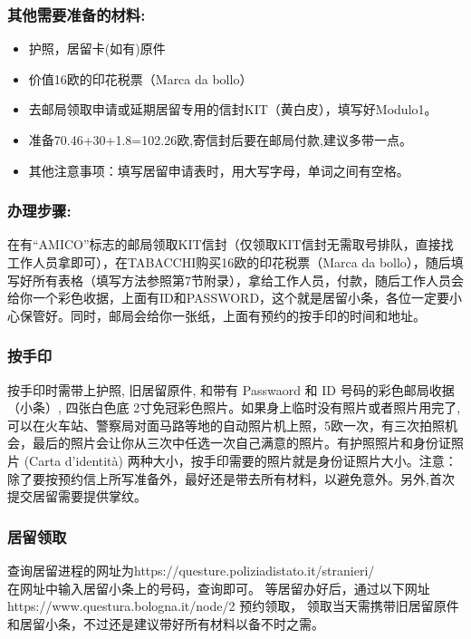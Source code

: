 \subsubsection{其他需要准备的材料:}
\begin{itemize} 
\item 护照，居留卡(如有)原件
\item 价值16欧的印花税票（Marca da bollo）
\item 去邮局领取申请或延期居留专用的信封KIT（黄白皮），填写好Modulo1。
\item 准备70.46+30+1.8=102.26欧,寄信封后要在邮局付款,建议多带一点。
\item 其他注意事项：填写居留申请表时，用大写字母，单词之间有空格。
\end{itemize}


\subsubsection{办理步骤:}
在有“AMICO”标志的邮局领取KIT信封（仅领取KIT信封无需取号排队，直接找工作人员拿即可），在TABACCHI购买16欧的印花税票（Marca da bollo），随后填写好所有表格（填写方法参照第7节附录），拿给工作人员，付款，随后工作人员会给你一个彩色收据，上面有ID和PASSWORD，这个就是居留小条，各位一定要小心保管好。同时，邮局会给你一张纸，上面有预约的按手印的时间和地址。


\subsubsection{按手印}
按手印时需带上护照, 旧居留原件, 和带有 Passwaord 和 ID 号码的彩色邮局收据（小条）, 四张白色底 2寸免冠彩色照片。如果身上临时没有照片或者照片用完了,可以在火车站、警察局对面马路等地的自动照片机上照，5欧一次，有三次拍照机会，最后的照片会让你从三次中任选一次自己满意的照片。有护照照片和身份证照片 (Carta d'identità)  两种大小，按手印需要的照片就是身份证照片大小。注意：除了要按预约信上所写准备外，最好还是带去所有材料，以避免意外。另外,首次提交居留需要提供掌纹。


\subsubsection{居留领取}
查询居留进程的网址为https://questure.poliziadistato.it/stranieri/\\
在网址中输入居留小条上的号码，查询即可。
等居留办好后，通过以下网址https://www.questura.bologna.it/node/2 预约领取，
领取当天需携带旧居留原件和居留小条，不过还是建议带好所有材料以备不时之需。


